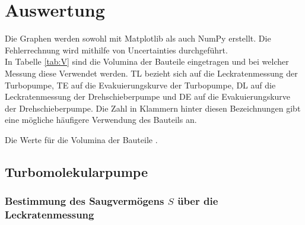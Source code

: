 \section{Auswertung}
\label{sec:Auswertung}

Die Graphen werden sowohl mit Matplotlib \cite{matplotlib} als auch NumPy \cite{numpy} erstellt. Die Fehlerrechnung wird mithilfe von Uncertainties \cite{uncertainties} durchgeführt.\\
In Tabelle \ref{tab:V} sind die Volumina der Bauteile eingetragen und bei welcher Messung diese Verwendet werden. TL bezieht sich auf die Leckratenmessung der Turbopumpe, TE auf die Evakuierungskurve der Turbopumpe, DL auf die Leckratenmessung der Drehschieberpumpe und DE auf die Evakuierungskurve der Drehschieberpumpe. Die Zahl in Klammern hinter diesen Bezeichnungen gibt eine mögliche häufigere Verwendung des Bauteils an.

\begin{table}
\centering
\caption{Die Werte für die Volumina der Bauteile \cite{V70}.}

\label{tab:V}
\end{table}

\subsection{Turbomolekularpumpe}

\subsubsection{Bestimmung des Saugvermögens $S$ über die Leckratenmessung}

